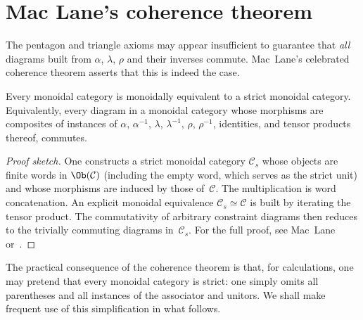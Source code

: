 \section{Mac Lane's coherence theorem}\label{sec:coherence}


The pentagon and triangle axioms may appear insufficient to guarantee that
\emph{all} diagrams built from $\alpha$, $\lambda$, $\rho$ and their
inverses commute.  Mac~Lane's celebrated coherence theorem asserts that
this is indeed the case.

\begin{theorem}\label{thm:maclane-coherence}
Every monoidal category is monoidally equivalent to a strict monoidal
category.  Equivalently, every diagram in a monoidal category whose
morphisms are composites of instances of $\alpha$, $\alpha^{-1}$,
$\lambda$, $\lambda^{-1}$, $\rho$, $\rho^{-1}$, identities, and tensor
products thereof, commutes.
\end{theorem}

\begin{proof}[Proof sketch]
One constructs a strict monoidal category $\mathcal{C}_s$ whose objects
are finite words in $\Ob(\mathcal{C})$ (including the empty word, which
serves as the strict unit) and whose morphisms are induced by those
of~$\mathcal{C}$.  The multiplication is word concatenation.
An explicit monoidal equivalence $\mathcal{C}_s \simeq \mathcal{C}$ is
built by iterating the tensor product.  The commutativity of arbitrary
constraint diagrams then reduces to the trivially commuting diagrams
in~$\mathcal{C}_s$.  For the full proof, see Mac~Lane~\cite{MacLane1963}
or~\cite{MacLaneCWM}.
\end{proof}

\begin{remark}\label{rem:coherence-practical}
The practical consequence of the coherence theorem is that, for
calculations, one may pretend that every monoidal category is strict:
one simply omits all parentheses and all instances of the
associator and unitors.  We shall make frequent use of this
simplification in what follows.
\end{remark}



